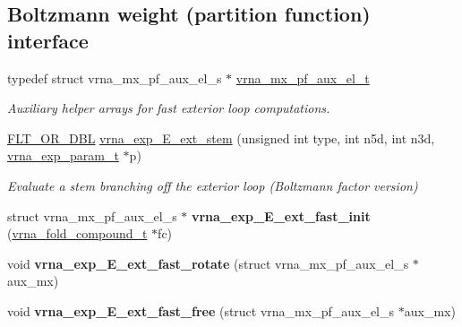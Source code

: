 \subsection*{Boltzmann weight (partition function) interface}
\begin{DoxyCompactItemize}
\item 
typedef struct vrna\+\_\+mx\+\_\+pf\+\_\+aux\+\_\+el\+\_\+s $\ast$ \hyperlink{group__eval__loops__ext_gaf9d5160c11ffad3ec258124a77fee13c}{vrna\+\_\+mx\+\_\+pf\+\_\+aux\+\_\+el\+\_\+t}
\begin{DoxyCompactList}\small\item\em Auxiliary helper arrays for fast exterior loop computations. \end{DoxyCompactList}\item 
\hyperlink{group__data__structures_ga31125aeace516926bf7f251f759b6126}{F\+L\+T\+\_\+\+O\+R\+\_\+\+D\+BL} \hyperlink{group__eval__loops__ext_ga357484958d3cd677f88f16c75c8a5730}{vrna\+\_\+exp\+\_\+\+E\+\_\+ext\+\_\+stem} (unsigned int type, int n5d, int n3d, \hyperlink{group__energy__parameters_ga01d8b92fe734df8d79a6169482c7d8d8}{vrna\+\_\+exp\+\_\+param\+\_\+t} $\ast$p)
\begin{DoxyCompactList}\small\item\em Evaluate a stem branching off the exterior loop (Boltzmann factor version) \end{DoxyCompactList}\item 
\mbox{\label{group__eval__loops__ext_ga2537300864b4498ab2bac23cc725719f}} 
struct vrna\+\_\+mx\+\_\+pf\+\_\+aux\+\_\+el\+\_\+s $\ast$ {\bfseries vrna\+\_\+exp\+\_\+\+E\+\_\+ext\+\_\+fast\+\_\+init} (\hyperlink{group__fold__compound_ga1b0cef17fd40466cef5968eaeeff6166}{vrna\+\_\+fold\+\_\+compound\+\_\+t} $\ast$fc)
\item 
\mbox{\label{group__eval__loops__ext_gabe4ed7e3d6152a3b9db4e4ed762aa1ba}} 
void {\bfseries vrna\+\_\+exp\+\_\+\+E\+\_\+ext\+\_\+fast\+\_\+rotate} (struct vrna\+\_\+mx\+\_\+pf\+\_\+aux\+\_\+el\+\_\+s $\ast$aux\+\_\+mx)
\item 
\mbox{\label{group__eval__loops__ext_ga4357b7937f1b840f063e44b859332f98}} 
void {\bfseries vrna\+\_\+exp\+\_\+\+E\+\_\+ext\+\_\+fast\+\_\+free} (struct vrna\+\_\+mx\+\_\+pf\+\_\+aux\+\_\+el\+\_\+s $\ast$aux\+\_\+mx)
\item 
\mbox{\label{group__eval__loops__ext_gacbcedbc2b94515a9dfb0b754e713ea16}} 

\end{DoxyCompactItemize}
